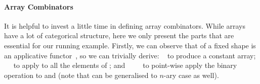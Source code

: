 \paragraph{Array Combinators} It is helpful to invest a little time
in defining array combinators.  While arrays have a lot of categorical structure,
here we only present the parts that are essential for our running example.
Firstly, we can observe that  of
a fixed shape is an applicative functor~\cite{applicative}, so we can trivially derive:
\  to produce a constant array; \ \ 
to apply  to all the elements of ; and \ 
\ \  to point-wise apply the binary operation 
 to  and  (note that  can be generalised
to $n$-ary case as well).
